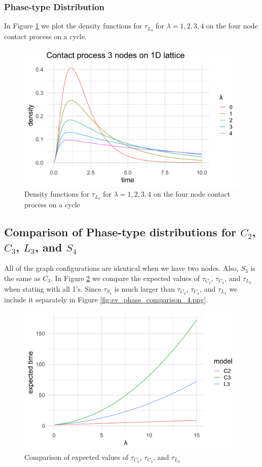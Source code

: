 \subsubsection{Phase-type Distribution}

In Figure \ref{fig:lattice_3_contact_phase_densities} we plot the density functions for $\tau_{L_3}$ for $\lambda = 1, 2, 3, 4$ on the four node contact process on a cycle.

\begin{figure}[H]
  \centering
    \includegraphics[width=.80\textwidth]{figures/lattice_3_contact_phase_densities.png}
   \caption{Density functions for $\tau_{L_3}$ for $\lambda = 1, 2, 3, 4$ on the four node contact process on a cycle}
  \label{fig:lattice_3_contact_phase_densities}
\end{figure}

\subsection{Comparison of Phase-type distributions for \texorpdfstring{$C_2$}{C2}, \texorpdfstring{$C_3$}{C3}, \texorpdfstring{$L_3$}{L3}, and \texorpdfstring{$S_4$}{S4}}

All of the graph configurations are identical when we have two nodes.
Also, $S_3$ is the same as $C_3$.
In Figure \ref{fig:ev_phase_comparison_3.png} we compare the expected values of $\tau_{C_2}$, $\tau_{C_3}$, and $\tau_{L_3}$ when stating with all 1's.
Since $\tau_{S_4}$ is much larger than $\tau_{C_2}$, $\tau_{C_3}$, and $\tau_{L_3}$ we include it separately in Figure \ref{fig:ev_phase_comparison_4.png}.

\begin{figure}[H]
  \centering
    \includegraphics[width=.80\textwidth]{figures/ev_phase_comparison_3.png}
   \caption{Comparison of expected values of $\tau_{C_2}$, $\tau_{C_3}$, and $\tau_{L_3}$}
  \label{fig:ev_phase_comparison_3.png}
\end{figure}

